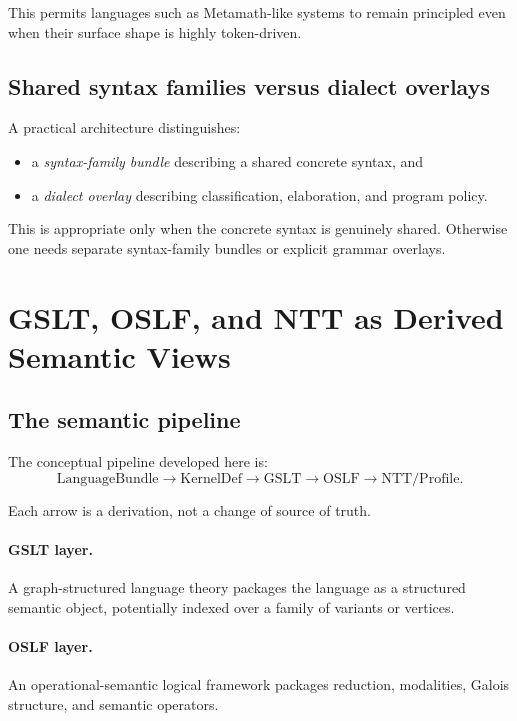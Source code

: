 \documentclass[11pt]{article}
\begin{document}
This permits languages such as Metamath-like systems to remain principled even when their surface shape is highly token-driven.

\subsection{Shared syntax families versus dialect overlays}

A practical architecture distinguishes:
\begin{itemize}[leftmargin=2em]
  \item a \emph{syntax-family bundle} describing a shared concrete syntax, and
  \item a \emph{dialect overlay} describing classification, elaboration, and program policy.
\end{itemize}

This is appropriate only when the concrete syntax is genuinely shared. Otherwise one needs separate syntax-family bundles or explicit grammar overlays.

\section{GSLT, OSLF, and NTT as Derived Semantic Views}

\subsection{The semantic pipeline}

The conceptual pipeline developed here is:
\[
\text{LanguageBundle} \longrightarrow \text{KernelDef} \longrightarrow \text{GSLT} \longrightarrow \text{OSLF} \longrightarrow \text{NTT/Profile}.
\]

Each arrow is a derivation, not a change of source of truth.

\paragraph{GSLT layer.}
A graph-structured language theory packages the language as a structured semantic object, potentially indexed over a family of variants or vertices.

\paragraph{OSLF layer.}
An operational-semantic logical framework packages reduction, modalities, Galois structure, and semantic operators.
\end{document}
